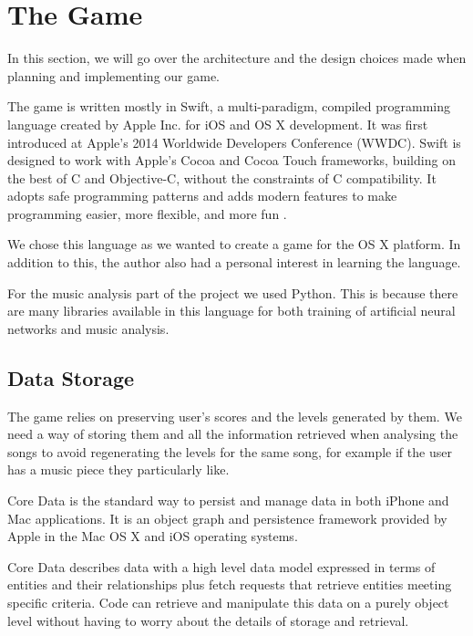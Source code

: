 \vspace{20pt}


\section{The Game}

In this section, we will go over the architecture and the design choices made when planning and implementing our game.

The game is written mostly in Swift, a multi-paradigm, compiled programming language created by Apple Inc. for iOS and OS X development. 
It was first introduced at Apple's 2014 Worldwide Developers Conference (WWDC). Swift is designed to work with Apple's Cocoa and Cocoa Touch frameworks, building on the best of C and Objective-C, without the constraints of C compatibility. It adopts safe programming patterns and adds modern features to make programming easier, more flexible, and more fun \cite{swiftintro}. 

We chose this language as we wanted to create a game for the OS X platform. In addition to this, the author also had a personal interest in learning the language.

For the music analysis part of the project we used Python. This is because there are many libraries available in this language for both training of artificial neural networks and music analysis. 

\vspace{10pt}


\subsection{Data Storage}

The game relies on preserving user's scores and the levels generated by them. We need a way of storing them and all the information retrieved when analysing the songs to avoid regenerating the levels for the same song, for example if the user has a music piece they particularly like.

Core Data is the standard way to persist and manage data in both iPhone and Mac applications. It is an object graph and persistence framework provided by Apple in the Mac OS X and iOS operating systems. 

Core Data describes data with a high level data model expressed in terms of entities and their relationships plus fetch requests that retrieve entities meeting specific criteria. Code can retrieve and manipulate this data on a purely object level without having to worry about the details of storage and retrieval. 


